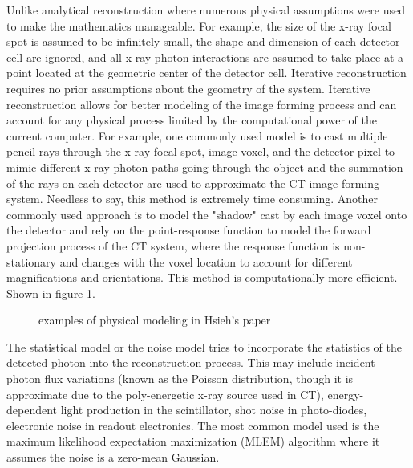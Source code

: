 Unlike analytical reconstruction where numerous physical assumptions were used to make the mathematics manageable.  For example, the size of the x-ray focal spot is assumed to be infinitely small, the shape and dimension of each detector cell are ignored, and all x-ray photon interactions are assumed to take place at a point located at the geometric center of the detector cell.  Iterative reconstruction requires no prior assumptions about the geometry of the system.  Iterative reconstruction allows for better modeling of the image forming process and can account for any physical process limited by the computational power of the current computer.  For example, one commonly used model is to cast multiple pencil rays through the x-ray focal spot, image voxel, and the detector pixel to mimic different x-ray photon paths going through the object and the summation of the rays on each detector are used to approximate the CT image forming system. Needless to say, this method is extremely time consuming.  Another commonly used approach is to model the "shadow" cast by each image voxel onto the detector and rely on the point-response function to model the forward projection process of the CT system, where the response function is non-stationary and changes with the voxel location to account for different magnifications and orientations.  This method is computationally more efficient.  Shown in figure \ref{fig:physical_modeling}.

\begin{figure}
\centering
	\begin{subfigure}[b]{0.4\linewidth}
	\centering
	\end{subfigure}
\hspace{0.2cm}
	\begin{subfigure}[b]{0.4\linewidth}
	\centering
	\end{subfigure}
\caption{examples of physical modeling in Hsieh's paper}
\label{fig:physical_modeling}
\end{figure}
 
The statistical model or the noise model tries to incorporate the statistics of the detected photon into the reconstruction process.  This may include incident photon flux variations (known as the Poisson distribution, though it is approximate due to the poly-energetic x-ray source used in CT), energy-dependent light production in the scintillator, shot noise in photo-diodes, electronic noise in readout electronics. The most common model used is the maximum likelihood expectation maximization (MLEM) algorithm where it assumes the noise is a zero-mean Gaussian.

